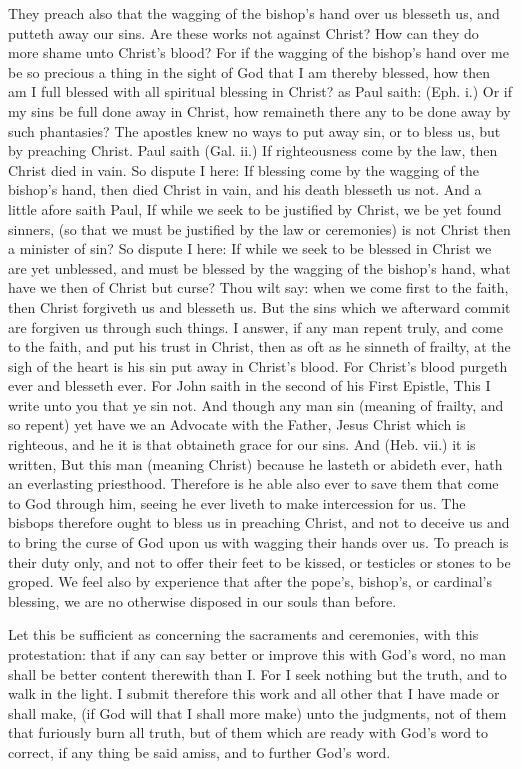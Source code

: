 \documentclass{custom}
\begin{document}
They preach also that the wagging of the bishop's hand 
over us blesseth us, and putteth away our sins. Are these 
works not against Christ? How can they do more shame 
unto Christ's blood? For if the wagging of the bishop's 
hand over me be so precious a thing in the sight of God 
that I am thereby blessed, how then am I full blessed with 
all spiritual blessing in Christ? as Paul saith: (Eph. i.) 
Or if my sins be full done away in Christ, how remaineth 
there any to be done away by such phantasies? The 
apostles knew no ways to put away sin, or to bless us, but by 
preaching Christ. Paul saith (Gal. ii.) If righteousness 
come by the law, then Christ died in vain. So dispute I 
here: If blessing come by the wagging of the bishop's 
hand, then died Christ in vain, and his death blesseth us 
not. And a little afore saith Paul, If while we seek to be 
justified by Christ, we be yet found sinners, (so that we 
must be justified by the law or ceremonies) is not Christ 
then a minister of sin? So dispute I here: If while we 
seek to be blessed in Christ we are yet unblessed, and 
must be blessed by the wagging of the bishop's hand, what 
have we then of Christ but curse? Thou wilt say: when we 
come first to the faith, then Christ forgiveth us and 
blesseth us. But the sins which we afterward commit are 
forgiven us through such things. I answer, if any man 
repent truly, and come to the faith, and put his trust in 
Christ, then as oft as he sinneth of frailty, at the sigh of the 
heart is his sin put away in Christ's blood. For Christ's 
blood purgeth ever and blesseth ever. For John saith in 
the second of his First Epistle, This I write unto you that 
ye sin not. And though any man sin (meaning of frailty, 
and so repent) yet have we an Advocate with the Father, 
Jesus Christ which is righteous, and he it is that obtaineth 
grace for our sins. And (Heb. vii.) it is written, But this 
man (meaning Christ) because he lasteth or abideth ever, 
hath an everlasting priesthood. Therefore is he able also 
ever to save them that come to God through him, seeing 
he ever liveth to make intercession for us. The bisbops 
therefore ought to bless us in preaching Christ, and not 
to deceive us and to bring the curse of God upon us with 
wagging their hands over us. To preach is their duty 
only, and not to offer their feet to be kissed, or testicles or 
stones to be groped. We feel also by experience that 
after the pope's, bishop's, or cardinal's blessing, we are 
no otherwise disposed in our souls than before. 

Let this be sufficient as concerning the sacraments and
ceremonies, with this protestation: that if any can say 
better or improve this with God's word, no man shall be 
better content therewith than I. For I seek nothing but 
the truth, and to walk in the light. I submit therefore this 
work and all other that I have made or shall make, (if 
God will that I shall more make) unto the judgments, 
not of them that furiously burn all truth, but of them 
which are ready with God's word to correct, if any thing 
be said amiss, and to further God's word. 
\end{document}

